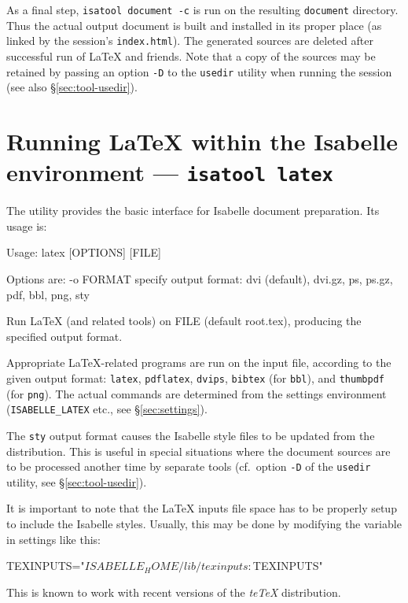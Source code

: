 \medskip As a final step, \texttt{isatool document -c} is run on the resulting
\texttt{document} directory.  Thus the actual output document is built and
installed in its proper place (as linked by the session's
\texttt{index.html}).  The generated sources are deleted after successful run
of {\LaTeX} and friends.  Note that a copy of the sources may be retained by
passing an option \texttt{-D} to the \texttt{usedir} utility when running the
session (see also \S\ref{sec:tool-usedir}).


\section{Running {\LaTeX} within the Isabelle environment --- \texttt{isatool latex}}
\label{sec:tool-latex}

The  utility provides the basic interface for Isabelle document
preparation.  Its usage is:
\begin{ttbox}
Usage: latex [OPTIONS] [FILE]

  Options are:
    -o FORMAT    specify output format: dvi (default), dvi.gz, ps,
                 ps.gz, pdf, bbl, png, sty

  Run LaTeX (and related tools) on FILE (default root.tex),
  producing the specified output format.
\end{ttbox}
Appropriate {\LaTeX}-related programs are run on the input file, according to
the given output format: \texttt{latex}, \texttt{pdflatex}, \texttt{dvips},
\texttt{bibtex} (for \texttt{bbl}), and \texttt{thumbpdf} (for \texttt{png}).
The actual commands are determined from the settings environment
(\texttt{ISABELLE_LATEX} etc., see \S\ref{sec:settings}).

The \texttt{sty} output format causes the Isabelle style files to be updated
from the distribution.  This is useful in special situations where the
document sources are to be processed another time by separate tools (cf.\ 
option \texttt{-D} of the \texttt{usedir} utility, see
\S\ref{sec:tool-usedir}).

It is important to note that the {\LaTeX} inputs file space has to be properly
setup to include the Isabelle styles.  Usually, this may be done by modifying
the \settdx{TEXINPUTS} variable in settings like this:
\begin{ttbox}
TEXINPUTS="$ISABELLE_HOME/lib/texinputs:$TEXINPUTS"
\end{ttbox}
This is known to work with recent versions of the \textsl{teTeX} distribution.


